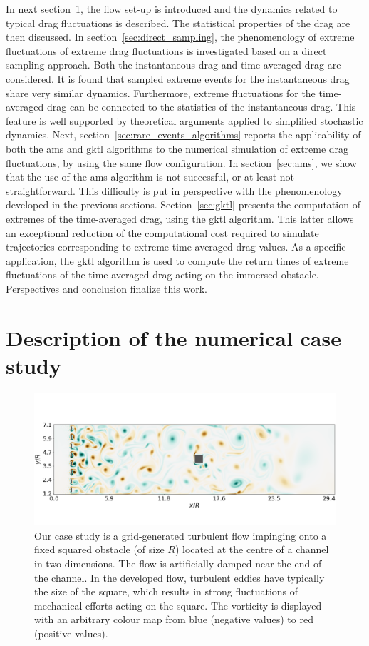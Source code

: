 \documentclass[pre,aps,floatfix,10pt,superscriptaddress, notitlepage,preprint]{revtex4-1}
\begin{document}
In next section~\ref{sec:test_flow}, the flow set-up is introduced and the dynamics related to typical
drag fluctuations is described.
The statistical properties of the drag are then discussed.
In section~\ref{sec:direct_sampling}, the phenomenology of extreme fluctuations of extreme
drag fluctuations is investigated based on a direct sampling approach.
Both the instantaneous drag and time-averaged drag are considered.
It is found that sampled extreme events for the instantaneous drag share very similar dynamics. Furthermore, extreme fluctuations for the time-averaged drag can be connected to the statistics of the instantaneous drag.
This feature is well supported by theoretical arguments applied to simplified stochastic dynamics.
Next, section~\ref{sec:rare_events_algorithms} reports the applicability of both the \ac{ams} and \ac{gktl} algorithms to the numerical simulation of extreme drag fluctuations, by using the same flow configuration.
In section~\ref{sec:ams}, we show that the use of the \ac{ams} algorithm is not successful, or at least not straightforward. This difficulty is put in perspective with the phenomenology developed in the previous sections.
Section~\ref{sec:gktl} presents the computation of extremes of the time-averaged drag, using the \ac{gktl} algorithm.
This latter allows an exceptional reduction of the computational cost required to simulate trajectories corresponding to extreme time-averaged drag values.
As a specific application, the \ac{gktl} algorithm is used to compute the return times of extreme fluctuations of the time-averaged drag acting on the immersed obstacle.
Perspectives and conclusion finalize this work.
	
\section{Description of the numerical case study}
\label{sec:test_flow}
	
\begin{figure}
\centering
\includegraphics[width=\linewidth]{illustr_ecoulement/illustr_ecoulement}
\caption{Our case study is a grid-generated turbulent flow impinging onto a fixed squared obstacle (of size $R$) located at the centre of a channel in two dimensions. The flow is artificially damped near the end of the channel. In the developed flow, turbulent eddies have typically the size of the square, which results in strong fluctuations of mechanical efforts acting on the square. The vorticity is displayed with an arbitrary colour map from blue (negative values) to red (positive values).}
\label{fig:illustr_ecoulement}
\end{figure}
	
\end{document}
